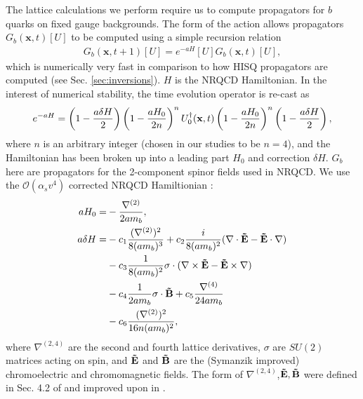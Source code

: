     The lattice calculations we perform require us to compute propagators for $b$ quarks on fixed gauge backgrounds. The form of the action allows propagators $G_b({\textbf{x}},t)[U]$ to be computed using a simple recursion relation
    \begin{align}
      G_b({\textbf{x}},t+1)[U] = e^{-aH}[U] G_b({\textbf{x}},t)[U],
      \label{eq:nrqcd_recursion}
    \end{align}
    which is numerically very fast in comparison to how HISQ propagators are computed (see Sec. \ref{sec:inversions}). $H$ is the NRQCD Hamiltonian. In the interest of numerical stability, the time evolution operator is re-cast as \cite{Lepage:1992tx}
    \begin{align}
      e^{-aH} = \left(1 - {a\delta H\over 2}\right)\left(1-{aH_0\over 2 n}\right)^n U_0^{\dagger}({\textbf{x}},t) \left(1 - {aH_0\over 2n}\right)^n \left(1-{a\delta H\over 2}\right),
    \end{align}
    where $n$ is an arbitrary integer (chosen in our studies to be $n=4$), and the Hamiltonian has been broken up into a leading part $H_0$ and correction $\delta H$. $G_b$ here are propagators for the 2-component spinor fields used in NRQCD. We use the $\mathcal{O}(\alpha_s v^4)$ corrected NRQCD Hamiltionian \cite{Lepage:1992tx}:
    \begin{align}
      aH_0 =& - {\nabla^{(2)}\over 2am_b} , \\
      \nonumber
      a\delta H =& - c_1 {(\nabla^{(2)})^2 \over 8 (am_b)^3} + c_2{ i\over 8(am_b)^2} ( \nabla\cdot {\bf{\tilde{E}}} - {\bf{\tilde{E}}}\cdot \nabla) \\
      \nonumber
      & - c_3 {1\over 8(am_b)^2} \sigma\cdot ( \nabla\times{\bf{\tilde{E}}} - {\bf{\tilde{E}}}\times\nabla) \\
      \nonumber
      & - c_4 {1\over 2am_b} \sigma\cdot {\bf{\tilde{B}}} + c_5 {\nabla^{(4)}\over 24 am_b} \\
      & - c_6 {(\nabla^{(2)})^2\over 16n (am_b)^2},
      \label{eq:nrqcd_dH}
    \end{align}
    where $\nabla^{(2,4)}$ are the second and fourth lattice derivatives, $\sigma$ are $SU(2)$ matrices acting on spin, and ${\bf{\tilde{E}}}$ and ${\bf{\tilde{B}}}$ are the (Symanzik improved) chromoelectric and chromomagnetic fields. The form of $\nabla^{(2,4)}$,${\bf{\tilde{E}}},{\bf{\tilde{B}}}$ were defined in Sec. 4.2 of \cite{Lepage:1992tx} and improved upon in \cite{Gray:2005ur}.

